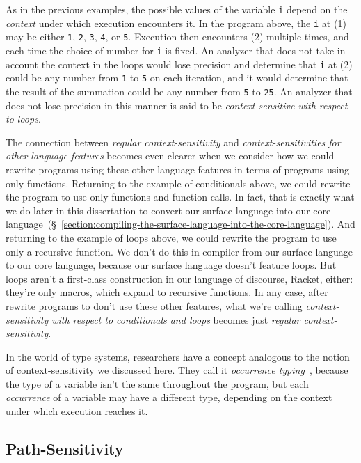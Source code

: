 \documentclass[12pt, oneside]{book}
\begin{document}
As in the previous examples, the possible values of the variable \texttt{i} depend on the \emph{context} under which execution encounters it. In the program above, the \texttt{i} at (1) may be either \texttt{1}, \texttt{2}, \texttt{3}, \texttt{4}, or \texttt{5}. Execution then encounters (2) multiple times, and each time the choice of number for \texttt{i} is fixed. An analyzer that does not take in account the context in the loops would lose precision and determine that \texttt{i} at (2) could be any number from \texttt{1} to \texttt{5} on each iteration, and it would determine that the result of the summation could be any number from \texttt{5} to \texttt{25}. An analyzer that does not lose precision in this manner is said to be \emph{context-sensitive with respect to loops}.

The connection between \emph{regular context-sensitivity} and \emph{context-sensitivities for other language features} becomes even clearer when we consider how we could rewrite programs using these other language features in terms of programs using only functions. Returning to the example of conditionals above, we could rewrite the program to use only functions and function calls. In fact, that is exactly what we do later in this dissertation to convert our surface language into our core language~(§~\ref{section:compiling-the-surface-language-into-the-core-language}). And returning to the example of loops above, we could rewrite the program to use only a recursive function. We don’t do this in compiler from our surface language to our core language, because our surface language doesn’t feature loops. But loops aren’t a first-class construction in our language of discourse, Racket, either: they’re only macros, which expand to recursive functions. In any case, after rewrite programs to don’t use these other features, what we’re calling \emph{context-sensitivity with respect to conditionals and loops} becomes just \emph{regular context-sensitivity}.

In the world of type systems, researchers have a concept analogous to the notion of context-sensitivity we discussed here. They call it \emph{occurrence typing}~\cite{typed-racket}, because the type of a variable isn’t the same throughout the program, but each \emph{occurrence} of a variable may have a different type, depending on the context under which execution reaches it.

\subsection{Path-Sensitivity}
\label{section:path-sensitivity}
\end{document}

